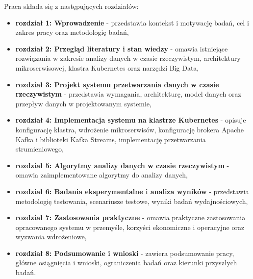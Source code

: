 Praca składa się z następujących rozdziałów:

\begin{itemize}
    \item \textbf{rozdział 1: Wprowadzenie} - przedstawia kontekst i motywację badań, cel i zakres pracy oraz metodologię badań,
    \item \textbf{rozdział 2: Przegląd literatury i stan wiedzy} - omawia istniejące rozwiązania w zakresie analizy danych w czasie rzeczywistym, architektury mikroserwisowej, klastra Kubernetes oraz narzędzi Big Data,
    \item \textbf{rozdział 3: Projekt systemu przetwarzania danych w czasie rzeczywistym} - przedstawia wymagania, architekturę, model danych oraz przepływ danych w projektowanym systemie,
    \item \textbf{rozdział 4: Implementacja systemu na klastrze Kubernetes} - opisuje konfigurację klastra, wdrożenie mikroserwisów, konfigurację brokera Apache Kafka i biblioteki Kafka Streams, implementację przetwarzania strumieniowego,
    \item \textbf{rozdział 5: Algorytmy analizy danych w czasie rzeczywistym} - omawia zaimplementowane algorytmy do analizy danych,
    \item \textbf{rozdział 6: Badania eksperymentalne i analiza wyników} - przedstawia metodologię testowania, scenariusze testowe, wyniki badań wydajnościowych,
    \item \textbf{rozdział 7: Zastosowania praktyczne} - omawia praktyczne zastosowania opracowanego systemu w przemyśle, korzyści ekonomiczne i operacyjne oraz wyzwania wdrożeniowe,
    \item \textbf{rozdział 8: Podsumowanie i wnioski} - zawiera podsumowanie pracy, główne osiągnięcia i wnioski, ograniczenia badań oraz kierunki przyszłych badań.
\end{itemize} 